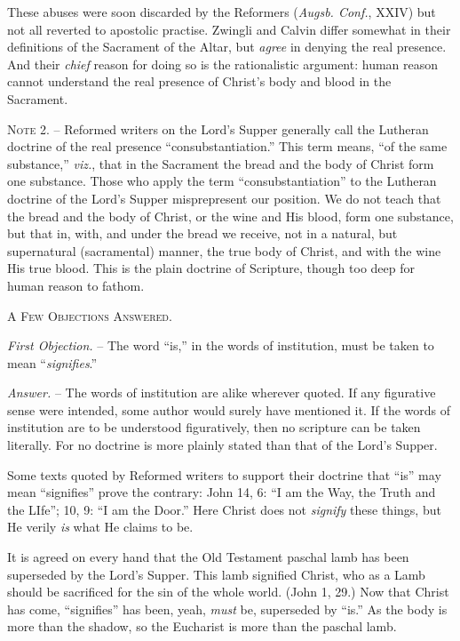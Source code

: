 \documentclass[
]{book}
\begin{document}
These abuses were soon discarded by the Reformers (\emph{Augsb. Conf.}, XXIV) but not all reverted to apostolic practise. Zwingli and Calvin differ somewhat in their definitions of the Sacrament of the Altar, but \emph{agree} in denying the real presence. And their \emph{chief} reason for doing so is the rationalistic argument: human reason cannot understand the real presence of Christ's body and blood in the Sacrament.

\textsc{Note 2. --} Reformed writers on the Lord's Supper generally call the Lutheran doctrine of the real presence ``consubstantiation.'' This term means, ``of the same substance,'' \emph{viz.}, that in the Sacrament the bread and the body of Christ form one substance. Those who apply the term ``consubstantiation'' to the Lutheran doctrine of the Lord's Supper misprepresent our position. We do not teach that the bread and the body of Christ, or the wine and His blood, form one substance, but that in, with, and under the bread we receive, not in a natural, but supernatural (sacramental) manner, the true body of Christ, and with the wine His true blood. This is the plain doctrine of Scripture, though too deep for human reason to fathom.

\begin{center}
\textsc{A Few Objections Answered.}
\end{center}

\emph{First Objection.} -- The word ``is,'' in the words of institution, must be taken to mean ``\emph{signifies}.''

\emph{Answer.} -- The words of institution are alike wherever quoted. If any figurative sense were intended, some author would surely have mentioned it. If the words of institution are to be understood figuratively, then no scripture can be taken literally. For no doctrine is more plainly stated than that of the Lord's Supper.

Some texts quoted by Reformed writers to support their doctrine that ``is'' may mean ``signifies'' prove the contrary: John 14, 6: ``I am the Way, the Truth and the LIfe''; 10, 9: ``I am the Door.'' Here Christ does not \emph{signify} these things, but He verily \emph{is} what He claims to be.

It is agreed on every hand that the Old Testament paschal lamb has been superseded by the Lord's Supper. This lamb signified Christ, who as a Lamb should be sacrificed for the sin of the whole world. (John 1, 29.) Now that Christ has come, ``signifies'' has been, yeah, \emph{must} be, superseded by ``is.'' As the body is more than the shadow, so the Eucharist is more than the paschal lamb.
\end{document}
